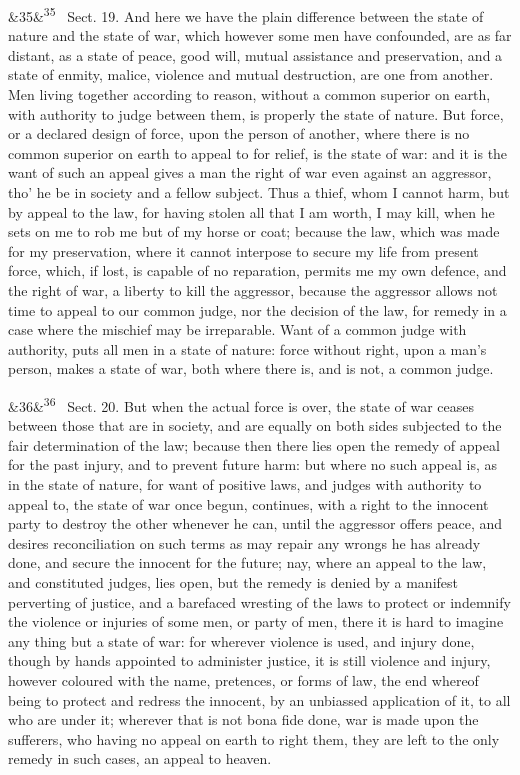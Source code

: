 \documentclass[12pt]{article}
\newcommand{\para}[1][]{\par\noindent\ifx&#1&\else\textsuperscript{\footnotesize #1}~\fi}
\begin{document}
\para[35] Sect. 19. And here we have the plain difference between the state of nature and the state of war, which however some men have confounded, are as far distant, as a state of peace, good will, mutual assistance and preservation, and a state of enmity, malice, violence and mutual destruction, are one from another. Men living together according to reason, without a common superior on earth, with authority to judge between them, is properly the state of nature. But force, or a declared design of force, upon the person of another, where there is no common superior on earth to appeal to for relief, is the state of war: and it is the want of such an appeal gives a man the right of war even against an aggressor, tho' he be in society and a fellow subject. Thus a thief, whom I cannot harm, but by appeal to the law, for having stolen all that I am worth, I may kill, when he sets on me to rob me but of my horse or coat; because the law, which was made for my preservation, where it cannot interpose to secure my life from present force, which, if lost, is capable of no reparation, permits me my own defence, and the right of war, a liberty to kill the aggressor, because the aggressor allows not time to appeal to our common judge, nor the decision of the law, for remedy in a case where the mischief may be irreparable. Want of a common judge with authority, puts all men in a state of nature: force without right, upon a man's person, makes a state of war, both where there is, and is not, a common judge.

\para[36] Sect. 20. But when the actual force is over, the state of war ceases between those that are in society, and are equally on both sides subjected to the fair determination of the law; because then there lies open the remedy of appeal for the past injury, and to prevent future harm: but where no such appeal is, as in the state of nature, for want of positive laws, and judges with authority to appeal to, the state of war once begun, continues, with a right to the innocent party to destroy the other whenever he can, until the aggressor offers peace, and desires reconciliation on such terms as may repair any wrongs he has already done, and secure the innocent for the future; nay, where an appeal to the law, and constituted judges, lies open, but the remedy is denied by a manifest perverting of justice, and a barefaced wresting of the laws to protect or indemnify the violence or injuries of some men, or party of men, there it is hard to imagine any thing but a state of war: for wherever violence is used, and injury done, though by hands appointed to administer justice, it is still violence and injury, however coloured with the name, pretences, or forms of law, the end whereof being to protect and redress the innocent, by an unbiassed application of it, to all who are under it; wherever that is not bona fide done, war is made upon the sufferers, who having no appeal on earth to right them, they are left to the only remedy in such cases, an appeal to heaven.
\end{document}
